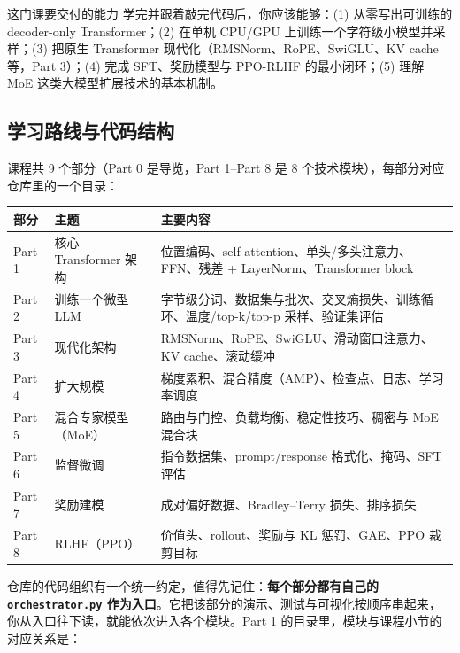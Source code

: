 \begin{importantbox}{这门课要交付的能力}
学完并跟着敲完代码后，你应该能够：(1) 从零写出可训练的 decoder-only Transformer；(2) 在单机 CPU/GPU 上训练一个字符级小模型并采样；(3) 把原生 Transformer 现代化（RMSNorm、RoPE、SwiGLU、KV cache 等，Part 3）；(4) 完成 SFT、奖励模型与 PPO-RLHF 的最小闭环；(5) 理解 MoE 这类大模型扩展技术的基本机制。
\end{importantbox}

\subsection{学习路线与代码结构}

课程共 9 个部分（Part 0 是导览，Part 1--Part 8 是 8 个技术模块），每部分对应仓库里的一个目录：

\begin{center}
\begin{tabular}{@{}p{1.2cm}p{5.4cm}p{7.6cm}@{}}
\toprule
部分 & 主题 & 主要内容 \\
\midrule
Part 1 & 核心 Transformer 架构 & 位置编码、self-attention、单头/多头注意力、FFN、残差 + LayerNorm、Transformer block \\
Part 2 & 训练一个微型 LLM & 字节级分词、数据集与批次、交叉熵损失、训练循环、温度/top-k/top-p 采样、验证集评估 \\
Part 3 & 现代化架构 & RMSNorm、RoPE、SwiGLU、滑动窗口注意力、KV cache、滚动缓冲 \\
Part 4 & 扩大规模 & 梯度累积、混合精度（AMP）、检查点、日志、学习率调度 \\
Part 5 & 混合专家模型（MoE） & 路由与门控、负载均衡、稳定性技巧、稠密与 MoE 混合块 \\
Part 6 & 监督微调 & 指令数据集、prompt/response 格式化、掩码、SFT 评估 \\
Part 7 & 奖励建模 & 成对偏好数据、Bradley--Terry 损失、排序损失 \\
Part 8 & RLHF（PPO） & 价值头、rollout、奖励与 KL 惩罚、GAE、PPO 裁剪目标 \\
\bottomrule
\end{tabular}
\end{center}

仓库的代码组织有一个统一约定，值得先记住：\textbf{每个部分都有自己的 \texttt{orchestrator.py} 作为入口}。它把该部分的演示、测试与可视化按顺序串起来，你从入口往下读，就能依次进入各个模块。Part 1 的目录里，模块与课程小节的对应关系是：

